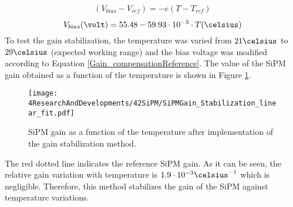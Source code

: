 \begin{equation*}
\begin{split}
(V_{bias}-V_{ref} )= -e \left( T -T_{ref} \right) 
\label{Gain_compensationEquation}
\end{split}
\end{equation*}
\begin{equation}
V_{bias}(\volt)= 55.48 - 59.93 \cdot{} 10^{-3} \cdot{} T(\celsius)
\label{Gain_compensationReference}
\end{equation}  
To test the gain stabilization, the temperature was varied from $21\celsius$ to $29\celsius$ (expected working range) and the bias voltage was modified according to Equation \ref{Gain_compensationReference}. The value of the SiPM gain obtained as a function of the temperature is shown in Figure \ref{fig:SiPMGainStabilization}.
\begin{figure}[hbtp]
\centering
\texttt{[image: 4ResearchAndDevelopments/42SiPM/SiPMGain\_Stabilization\_linear\_fit.pdf]}
\caption{SiPM gain as a function of the temperature after implementation of the gain stabilization method. \label{fig:SiPMGainStabilization}}
\end{figure}
The red dotted line indicates the reference SiPM gain. As it can be seen, the relative gain variation with temperature is $1.9 \cdot{} 10^{-3} \celsius^{-1}$ which is negligible. Therefore, this method stabilizes the gain of the SiPM against temperature variations.